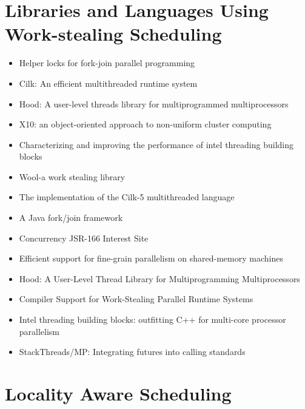 \section{Libraries and Languages Using Work-stealing Scheduling}
\label{sec:lr-libaries-and-languages-using-work-stealing-scheduling}

\begin{itemize}
\item Helper locks for fork-join parallel programming
  \cite{Agrawal2010}
\item Cilk: An efficient multithreaded runtime system
  \cite{Blumofe1995}
\item Hood: A user-level threads library for multiprogrammed
  multiprocessors \cite{Blumofe1998}
\item X10: an object-oriented approach to non-uniform cluster
  computing \cite{Charles2005}
\item Characterizing and improving the performance of intel threading
  building blocks \cite{Contreras2008}
\item Wool-a work stealing library \cite{Faxen2009}
\item The implementation of the Cilk-5 multithreaded language
  \cite{Frigo1998}
\item A Java fork/join framework \cite{Lea2000}
\item Concurrency JSR-166 Interest Site \cite{Lea}
\item Efficient support for fine-grain parallelism on shared-memory
  machines \cite{Lowenthal1998}
\item Hood: A User-Level Thread Library for Multiprogramming
  Multiprocessors \cite{Papadopoulos1998}
\item Compiler Support for Work-Stealing Parallel Runtime Systems
  \cite{Raman2009}
\item Intel threading building blocks: outfitting C++ for multi-core
  processor parallelism \cite{Reinders2007}
\item StackThreads/MP: Integrating futures into calling standards
  \cite{Taura1999}
\end{itemize}


\section{Locality Aware Scheduling}
\label{sec:lr-locality-aware-scheduling}

